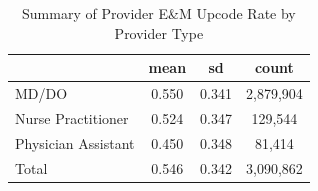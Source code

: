 \begin{table}[htbp]\centering
\def\sym#1{\ifmmode^{#1}\else\(^{#1}\)\fi}
\caption{Summary of Provider E\&M Upcode Rate by Provider Type}
\begin{tabular}{l*{1}{ccc}}
\toprule
                    &        mean&          sd&       count\\
\midrule
MD/DO               &       0.550&       0.341&   2,879,904\\
Nurse Practitioner  &       0.524&       0.347&     129,544\\
Physician Assistant &       0.450&       0.348&      81,414\\
Total               &       0.546&       0.342&   3,090,862\\
\bottomrule
\end{tabular}
\end{table}
